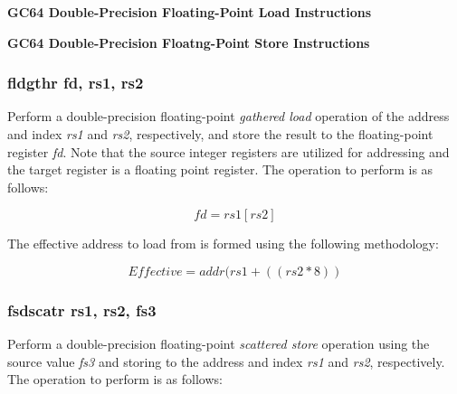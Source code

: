 \documentclass{article}
\begin{document}
\begin{center}
\textbf{GC64 Double-Precision Floating-Point Load Instructions}
\makebox[0.03in][s]{}\makebox[0.03in][s]{}\makebox[0.03in][s]{}\makebox[0.03in][s]{}\makebox[0.03in][s]{}
\end{center}

\begin{center}
\textbf{GC64 Double-Precision Floatng-Point Store Instructions}
\makebox[0.03in][s]{}\makebox[0.03in][s]{}\makebox[0.03in][s]{}\makebox[0.03in][s]{}\makebox[0.03in][s]{}
\end{center}


\subsubsection{fldgthr fd, rs1, rs2}

Perform a double-precision floating-point \emph{gathered load} operation of the
address and index \emph{rs1} and \emph{rs2}, respectively, and store the result
to the floating-point register \emph{fd}.  Note that the source integer registers are
utilized for addressing and the target register is a floating point register.
The operation to perform is as follows:

\begin{equation}
fd = rs1[rs2]
\end{equation}

The effective address to load
from is formed using the following methodology:

\begin{equation}
Effective = addr(rs1 + ((rs2 * 8))
\end{equation}


\subsubsection{fsdscatr rs1, rs2, fs3}

Perform a double-precision floating-point \emph{scattered store} operation 
using the source value \emph{fs3} and storing to the address and index
\emph{rs1} and \emph{rs2}, respectively.  The operation to
perform is as follows: 
\end{document}

